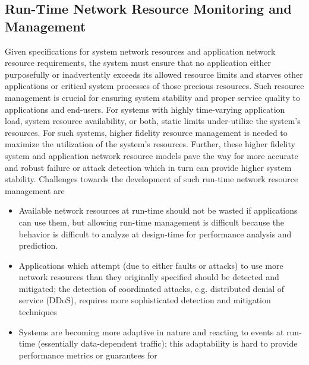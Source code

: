 \subsection{Run-Time Network Resource Monitoring and Management}
Given specifications for system network resources and application network resource requirements, the system must ensure that no application either purposefully or inadvertently exceeds its allowed resource limits and starves other applications or critical system processes of those precious resources.  Such resource management is crucial for ensuring system stability and proper service quality to applications and end-users.  For systems with highly time-varying application load, system resource availability, or both, static limits under-utilize the system's resources.  For such systems, higher fidelity resource management is needed to maximize the utilization of the system's resources.  Further, these higher fidelity system and application network resource models pave the way for more accurate and robust failure or attack detection which in turn can provide higher system stability.  Challenges towards the development of such run-time network resource management are 
\begin{itemize}
	\item Available network resources at run-time should not be wasted if applications can use them, but allowing run-time management is difficult because the behavior is difficult to analyze at design-time for performance analysis and prediction.
	\item Applications which attempt (due to either faults or attacks) to use more network resources than they originally specified should be detected and mitigated; the detection of coordinated attacks, e.g. distributed denial of service (DDoS), requires more sophisticated detection and mitigation techniques
	\item Systems are becoming more adaptive in nature and reacting to events at run-time (essentially data-dependent traffic); this adaptability is hard to provide performance metrics or guarantees for
\end{itemize}

